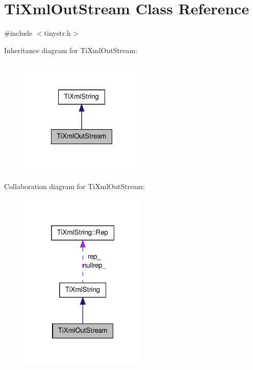 \hypertarget{classTiXmlOutStream}{
\section{TiXmlOutStream Class Reference}
\label{dc/d34/classTiXmlOutStream}
}


{\ttfamily \#include $<$tinystr.h$>$}



Inheritance diagram for TiXmlOutStream:
\nopagebreak
\begin{figure}[H]
\begin{center}
\leavevmode
\includegraphics[width=168pt]{db/d95/classTiXmlOutStream__inherit__graph}
\end{center}
\end{figure}


Collaboration diagram for TiXmlOutStream:
\nopagebreak
\begin{figure}[H]
\begin{center}
\leavevmode
\includegraphics[width=172pt]{d2/d24/classTiXmlOutStream__coll__graph}
\end{center}
\end{figure}
